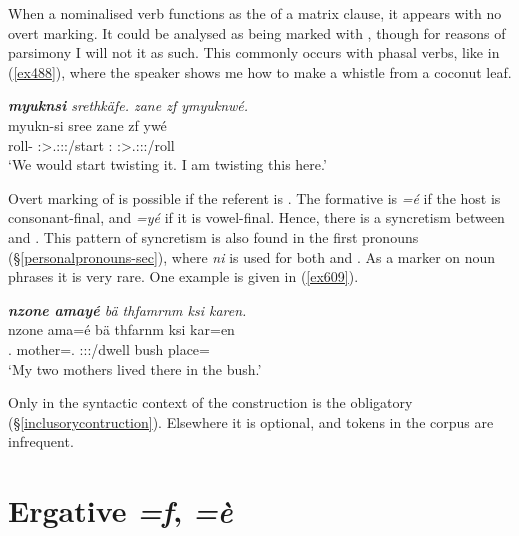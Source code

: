 When a nominalised verb functions as the  of a matrix clause, it appears with no overt  marking. It could be analysed as being marked with  , though for reasons of parsimony I will not  it as such. This commonly occurs with phasal verbs, like in (\ref{ex488}), where the speaker shows me how to make a whistle from a coconut leaf.

\begin{exe}
	\ex \emph{\textbf{myuknsi} srethkäfe. zane zf ymyuknwé.}\\
	\gll myukn-si sree zane zf ywé\\
	roll-{\Nmlz} \Fpl:\Sbj>\Tsg.\Masc:\Obj:\Irr:\Pfv/start \Dem:{\Prox} {\Imm} \Fsg:\Sbj>\Tsg.\Masc:\Obj:\Nonpast:\Ipfv/roll\\
	\trans `We would start twisting it. I am twisting this here.'
	\label{ex488}
\end{exe}

Overt marking of   is possible if the referent is . The formative is \emph{=é} if the host is consonant-final, and \emph{=yé} if it is vowel-final. Hence, there is a syncretism between  and  . This pattern of syncretism is also found in the first  pronouns ({\S}\ref{personalpronouns-sec}), where \emph{ni} is used for both  and  . As a  marker on  noun phrases it is very rare. One example is given in (\ref{ex609}).

\begin{exe}
	\ex \emph{\textbf{nzone amayé} bä thfamrnm ksi karen.}\\
	\gll nzone ama=é bä thfarnm ksi kar=en\\
	\Fsg.{\Poss} mother=\Abs.{\Nsg} \Med{} \Stdu:\Sbj:\Pst:\Dur/dwell bush place=\Loc\\
	\trans `My two mothers lived there in the bush.'
	\label{ex609}
\end{exe}
	
Only in the syntactic context of the  construction is the   obligatory ({\S}\ref{inclusorycontruction}). Elsewhere it is optional, and tokens in the corpus are infrequent.
	
\section{Ergative \emph{=f}, \emph{=è}}\label{ergcase}

